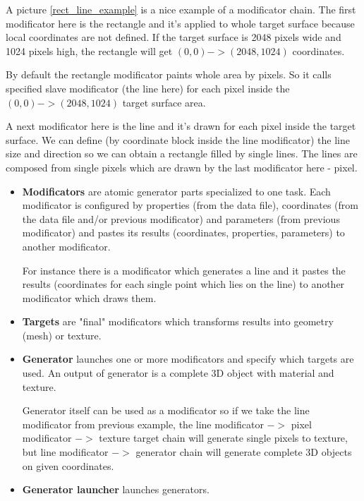 \documentclass[9pt]{article}
\begin{document}
A picture \ref{rect_line_example} is a nice example of a modificator chain. The first
modificator here is the rectangle and it's applied to whole
target surface because local coordinates are not defined. If the target surface
is 2048 pixels wide and 1024 pixels high, the rectangle will get \begin{math}(0,0) 
-> (2048, 1024)\end{math} coordinates. 

By default the rectangle modificator paints whole area by pixels. So it calls
specified slave modificator (the line here) for each pixel inside the \begin{math}(0,0) 
-> (2048, 1024)\end{math} target surface area.

A next modificator here is the line and it's drawn for each pixel inside the
target surface. We can define (by coordinate block inside the line modificator) the line
size and direction so we can obtain a rectangle filled by single lines. 
The lines are composed from single pixels which are drawn by 
the last modificator here - pixel.

\begin{itemize}
\item{\bf Modificators} are atomic generator parts specialized to one task. 
Each modificator is configured by properties (from the data file), 
coordinates (from the data file and/or previous modificator) and 
parameters (from previous modificator) and pastes its results 
(coordinates, properties, parameters) to another modificator.

For instance there is a modificator which generates a line and it 
pastes the results (coordinates for each single point which lies on the line) 
to another modificator which draws them.

\item{\bf Targets} are "final" modificators which transforms 
results into geometry (mesh) or texture. 

\item{\bf Generator} launches one or more modificators and 
specify which targets are used. An output of generator is 
a complete 3D object with material and texture. 

Generator itself can be used as a modificator so
if we take the line modificator from previous example, 
the line modificator \begin{math}->\end{math} pixel modificator \begin{math}->\end{math} 
texture target chain will generate single pixels to texture, but line modificator 
\begin{math}->\end{math} generator chain will generate complete 3D objects on given coordinates.

\item{\bf Generator launcher} launches generators.

\end{itemize}
\end{document}
